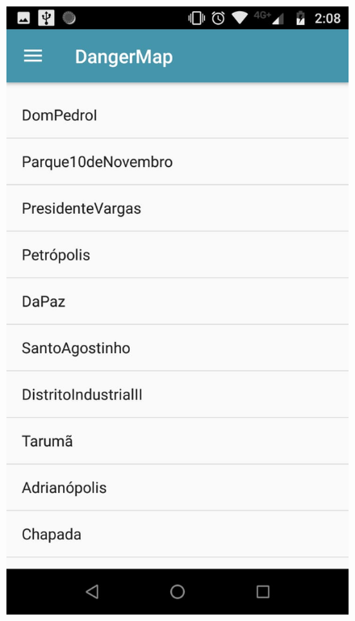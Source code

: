 \documentclass[
	12pt,				%
	openright,			%
	twoside,			%
	a4paper,			%
	english,			%
	french,				%
	spanish,			%
	brazil,				%
	]{abntex2}
\begin{document}
\begin{figure}[!htb]
{		\includegraphics[scale=0.19]{figuras/tela-listabairros.jpeg}
		\label{tela_list_bairros}
	}
	\quad %
\end{figure}
\end{document}
